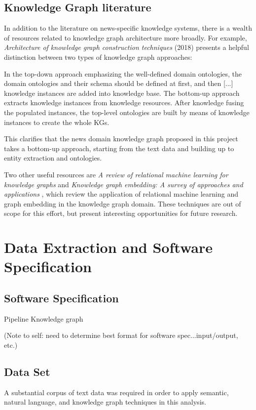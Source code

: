 \documentclass[11pt]{article}
\begin{document}
\subsection{Knowledge Graph literature}

In addition to the literature on news-specific knowledge systems, there is a wealth of resources related to knowledge graph architecture more broadly. For example, \textit{Architecture of knowledge graph construction techniques} (2018) \cite{zhao2018architecture} presents a helpful distinction between two types of knowledge graph approaches:

\begin{displayquote}
In the top-down approach emphasizing the well-defined domain ontologies, the domain ontologies and their schema should be defined at first, and then [...] knowledge instances are added into knowledge base. The bottom-up approach extracts knowledge instances from knowledge resources. After knowledge fusing the populated instances, the top-level ontologies are built by means of knowledge instances to create the whole KGs.
\end{displayquote}

This clarifies that the news domain knowledge graph proposed in this project takes a bottom-up approach, starting from the text data and building up to entity extraction and ontologies.

Two other useful resources are \textit{A review of relational machine learning for knowledge graphs} \cite{nickel2015review} and \textit{Knowledge graph embedding: A survey of approaches and applications} \cite{wang2017knowledge}, which review the application of relational machine learning and graph embedding in the knowledge graph domain. These techniques are out of scope for this effort, but present interesting opportunities for future research.

\section{Data Extraction and Software Specification}
\subsection{Software Specification}
Pipeline
Knowledge graph

(Note to self: need to determine best format for software spec...input/output, etc.)

\subsection{Data Set}
A substantial corpus of text data was required in order to apply semantic, natural language, and knowledge graph techniques in this analysis.
\end{document}
